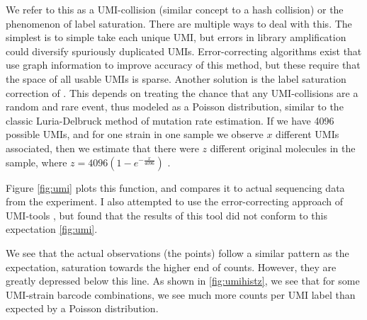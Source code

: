 We refer
to this as a UMI-collision (similar concept to a hash collision) or the
phenomenon of label saturation. 
There are multiple ways to deal with this.
The simplest is to simple take each unique UMI, but errors in library
amplification could diversify spuriously duplicated UMIs.
Error-correcting algorithms 
exist that use graph information to improve accuracy of this method, but
these require that the space of all usable UMIs is sparse. 
Another solution is the label saturation correction of 
\cite{fu2011counting}. This depends
on treating the chance that any UMI-collisions are a random and rare
event, thus modeled as a Poisson distribution, similar to the classic
Luria-Delbruck method of mutation rate estimation. 
If we have 4096 possible
UMIs, and for one strain in one sample we observe \(x\) different UMIs
associated, then we estimate that there were \(z\) different original
molecules in the sample, where
\(z=4096 (1-e^{-\frac{x}{4096}})\) .

\label{subsubsection:rarefractionDiscussion}

Figure \ref{fig:umi} plots this function, and compares it to
actual sequencing data from the experiment.
I also attempted to use the error-correcting approach of UMI-tools
\parencite{smith2017umi}, but found that the results of this
tool did not conform to this expectation \autoref{fig:umi}. 


We see that the actual observations (the points) follow a similar
pattern as the expectation, saturation towards the higher end of counts.
However, they are greatly depressed below this line. As shown in
\autoref{fig:umihistz}, we see that for some UMI-strain barcode
combinations, we see much more counts per UMI label than expected by a
Poisson distribution. 

